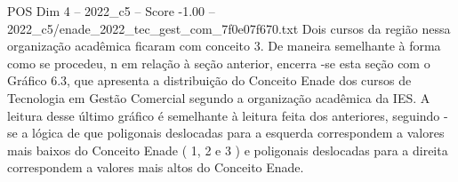 \begin{textsample}{POS Dim 4 – 2022\_c5 – Score -1.00 – 2022\_c5/enade\_2022\_tec\_gest\_com\_7f0e07f670.txt}
Dois cursos da região nessa organização acadêmica ficaram com conceito 3.
De maneira semelhante à forma como se procedeu, n em relação à seção anterior, encerra -se esta seção com o Gráfico 6.3, que apresenta a distribuição do Conceito Enade dos cursos de Tecnologia em Gestão Comercial segundo a organização acadêmica da IES.
A leitura desse último gráfico é semelhante à leitura feita dos anteriores, seguindo -se a lógica de que poligonais deslocadas para a esquerda correspondem a valores mais baixos do Conceito Enade ( 1, 2 e 3 ) e poligonais deslocadas para a direita correspondem a valores mais altos do Conceito Enade.

\end{textsample}
